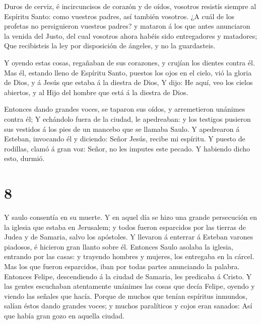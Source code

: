  Duros de cerviz, é incircuncisos de corazón y de oídos,
vosotros resistís siempre al Espíritu Santo: como vuestros padres, así
también vosotros.  ¿A cuál de los profetas no persiguieron
vuestros padres? y mataron á los que antes anunciaron la venida del
Justo, del cual vosotros ahora habéis sido entregadores y matadores;
 Que recibisteis la ley por disposición de ángeles, y no la
guardasteis.

 Y oyendo estas cosas, regañaban de sus corazones, y
crujían los dientes contra él.  Mas él, estando lleno de
Espíritu Santo, puestos los ojos en el cielo, vió la gloria de Dios, y á
Jesús que estaba á la diestra de Dios,  Y dijo: He aquí,
veo los cielos abiertos, y al Hijo del hombre que está á la diestra de
Dios.

 Entonces dando grandes voces, se taparon sus oídos, y
arremetieron unánimes contra él;  Y echándolo fuera de la
ciudad, le apedreaban: y los testigos pusieron sus vestidos á los pies
de un mancebo que se llamaba Saulo.  Y apedrearon á
Esteban, invocando él y diciendo: Señor Jesús, recibe mi espíritu.
 Y puesto de rodillas, clamó á gran voz: Señor, no les
imputes este pecado. Y habiendo dicho esto, durmió.

\hypertarget{section-7}{%
\section{8}\label{section-7}}

 Y saulo consentía en su muerte. Y en aquel día se hizo una
grande persecución en la iglesia que estaba en Jerusalem; y todos fueron
esparcidos por las tierras de Judea y de Samaria, salvo los apóstoles.
 Y llevaron á enterrar á Esteban varones piadosos, é
hicieron gran llanto sobre él.  Entonces Saulo asolaba la
iglesia, entrando por las casas: y trayendo hombres y mujeres, los
entregaba en la cárcel.  Mas los que fueron esparcidos, iban
por todas partes anunciando la palabra.  Entonces Felipe,
descendiendo á la ciudad de Samaria, les predicaba á Cristo.
 Y las gentes escuchaban atentamente unánimes las cosas que
decía Felipe, oyendo y viendo las señales que hacía.  Porque
de muchos que tenían espíritus inmundos, salían éstos dando grandes
voces; y muchos paralíticos y cojos eran sanados:  Así que
había gran gozo en aquella ciudad.


